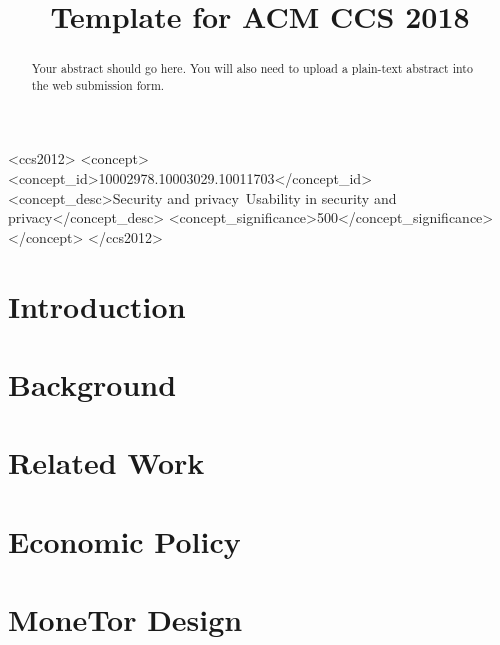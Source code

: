 \documentclass[sigconf, anonymous]{acmart}
\begin{document}
\title{Template for ACM CCS 2018} %

\begin{abstract}
Your abstract should go here. You will also need to upload a plain-text abstract into the web submission form.
\end{abstract}

\begin{CCSXML}
<ccs2012>
<concept>
<concept_id>10002978.10003029.10011703</concept_id>
<concept_desc>Security and privacy~Usability in security and privacy</concept_desc>
<concept_significance>500</concept_significance>
</concept>
</ccs2012>
\end{CCSXML}



\maketitle

\section{Introduction}
\label{sec:introduction}


\section{Background}
\label{sec:background}


\section{Related Work}
\label{sec:related_work}


\section{Economic Policy}
\label{sec:tor_incentives}


\section{MoneTor Design}
\label{sec:design}

\end{document}
